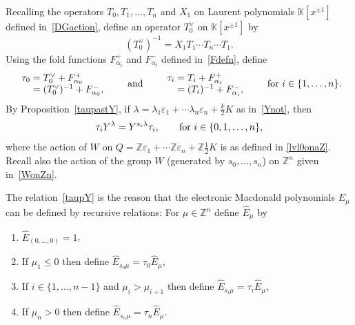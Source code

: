 \documentclass[11pt]{article}
\theoremstyle{plain}
\theoremstyle{definition}
\theoremstyle{remark}
\numberwithin{equation}{section}
\def\KK{\mathbb{K}}
\def\ZZ{\mathbb{Z}}
\newcounter{r}
\newcounter{s}
\begin{document}
Recalling the operators $T_0, T_1, \ldots, T_n$ and $X_1$ on Laurent polynomials
$\KK[x^{\pm1}]$ defined in~\eqref{DGaction}, 
define an operator $T_0^{\vee}$
on $\KK[x^{\pm1}]$ by
\begin{equation}
(T_0^{\vee})^{-1} = X_1T_1\cdots T_n\cdots T_1.
\label{TiveeonKX}
\end{equation}
Using the fold functions $F^+_{\alpha_i}$ and $F^-_{\alpha_i}$ defined in~\eqref{Fdefn},  define
\begin{equation}
\begin{array}{r@{\;}c@{\;}l} 
\tau_{0} &=&  T_{0}^{\vee} + F^+_{\alpha_0}\\
&=& (T_{0}^{\vee})^{-1} +  F^-_{\alpha_0},
\end{array}
\qquad\text{and}\qquad
\begin{array}{r@{\;}c@{\;}l}
\tau_i &=& T_i + F^+_{\alpha_i} \\
&=& (T_i)^{-1} +  F^-_{\alpha_i},
\end{array}
\qquad\hbox{for $i\in \{1, \ldots, n\}$.}
\label{tauvee}
\end{equation}
By Proposition~\ref{taupastY}, if $\lambda = \lambda_1\varepsilon_1+\cdots \lambda_n \varepsilon_n+\frac{k}{2}K$
as in~\eqref{Ynot}, then
\begin{equation}
\tau_i Y^{\lambda} = Y^{s_i\lambda} \tau_i,
\qquad\hbox{for $i\in \{0,1,\ldots, n\}$,}
\label{taupY}
\end{equation}
where the action of $W$ on $Q = \ZZ\varepsilon_1+\cdots\ZZ\varepsilon_n + \ZZ\frac12 K$ is as defined in
\eqref{lvl0onaZ}. 
Recall also the action of the group $W$ (generated by $s_0,\ldots, s_n$) on $\ZZ^n$ given in~\eqref{WonZn}. 

The relation~\eqref{taupY} is the reason that the electronic Macdonald polynomials $E_\mu$ can be defined by recursive relations:
For $\mu\in \ZZ^n$ define $\widehat{E}_\mu$ by
\begin{enumerate}
\item[(E0)] $\widehat{E}_{(0,\ldots, 0)} = 1$,
\item[(E1)] If $\mu_1 \le 0$ then define $\widehat{E}_{s_0\mu} = 
\tau_0 \widehat{E}_\mu$,
\item[(E2)] If $i\in \{1, \ldots, n-1\}$ and $\mu_i>\mu_{i+1}$ then define
$\widehat{E}_{s_i\mu} = 
\tau_i \widehat{E}_\mu$,
\item[(E3)] 
If $\mu_n>0$ then define $\widehat{E}_{s_n\mu} =  
\tau_n \widehat{E}_\mu$.
\end{enumerate}
\end{document}
